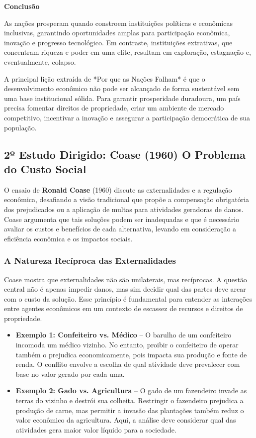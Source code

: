 \documentclass[a4paper,12pt]{article}[abntex2]
\begin{document}
\textbf{Conclusão}

As nações prosperam quando constroem instituições políticas e econômicas inclusivas, garantindo oportunidades amplas para participação econômica, inovação e progresso tecnológico. Em contraste, instituições extrativas, que concentram riqueza e poder em uma elite, resultam em exploração, estagnação e, eventualmente, colapso.

A principal lição extraída de *Por que as Nações Falham* é que o desenvolvimento econômico não pode ser alcançado de forma sustentável sem uma base institucional sólida. Para garantir prosperidade duradoura, um país precisa fomentar direitos de propriedade, criar um ambiente de mercado competitivo, incentivar a inovação e assegurar a participação democrática de sua população.

\subsection{\textbf{2º Estudo Dirigido: Coase (1960) O Problema do Custo Social}}

O ensaio de \textbf{Ronald Coase} (1960) discute as externalidades e a regulação econômica, desafiando a visão tradicional que propõe a compensação obrigatória dos prejudicados ou a aplicação de multas para atividades geradoras de danos. Coase argumenta que tais soluções podem ser inadequadas e que é necessário avaliar os custos e benefícios de cada alternativa, levando em consideração a eficiência econômica e os impactos sociais.

\subsubsection{A Natureza Recíproca das Externalidades}

Coase mostra que externalidades não são unilaterais, mas recíprocas. A questão central não é apenas impedir danos, mas sim decidir qual das partes deve arcar com o custo da solução. Esse princípio é fundamental para entender as interações entre agentes econômicos em um contexto de escassez de recursos e direitos de propriedade.

\begin{itemize}
    \item \textbf{Exemplo 1: Confeiteiro vs. Médico} – O barulho de um confeiteiro incomoda um médico vizinho. No entanto, proibir o confeiteiro de operar também o prejudica economicamente, pois impacta sua produção e fonte de renda. O conflito envolve a escolha de qual atividade deve prevalecer com base no valor gerado por cada uma.
    \item \textbf{Exemplo 2: Gado vs. Agricultura} – O gado de um fazendeiro invade as terras do vizinho e destrói sua colheita. Restringir o fazendeiro prejudica a produção de carne, mas permitir a invasão das plantações também reduz o valor econômico da agricultura. Aqui, a análise deve considerar qual das atividades gera maior valor líquido para a sociedade.
\end{itemize}
\end{document}
